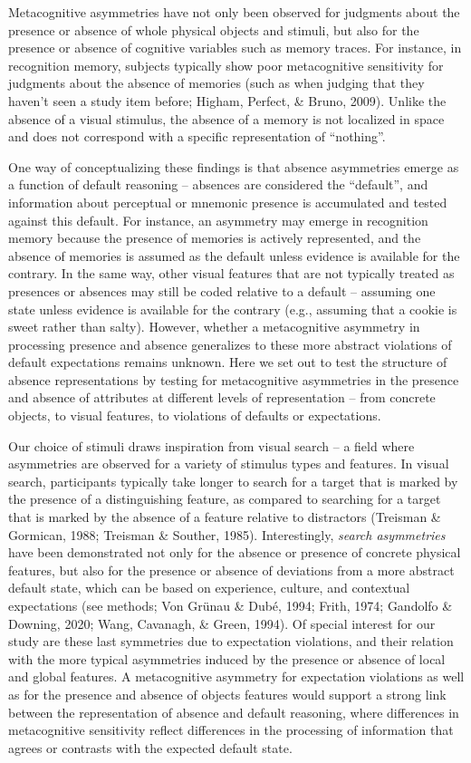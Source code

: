\documentclass[
  english,
  man,floatsintext]{apa6}
\begin{document}
Metacognitive asymmetries have not only been observed for judgments about the presence or absence of whole physical objects and stimuli, but also for the presence or absence of cognitive variables such as memory traces. For instance, in recognition memory, subjects typically show poor metacognitive sensitivity for judgments about the absence of memories (such as when judging that they haven't seen a study item before; Higham, Perfect, \& Bruno, 2009). Unlike the absence of a visual stimulus, the absence of a memory is not localized in space and does not correspond with a specific representation of \enquote{nothing}.

One way of conceptualizing these findings is that absence asymmetries emerge as a function of default reasoning -- absences are considered the \enquote{default}, and information about perceptual or mnemonic presence is accumulated and tested against this default. For instance, an asymmetry may emerge in recognition memory because the presence of memories is actively represented, and the absence of memories is assumed as the default unless evidence is available for the contrary. In the same way, other visual features that are not typically treated as presences or absences may still be coded relative to a default -- assuming one state unless evidence is available for the contrary (e.g., assuming that a cookie is sweet rather than salty). However, whether a metacognitive asymmetry in processing presence and absence generalizes to these more abstract violations of default expectations remains unknown. Here we set out to test the structure of absence representations by testing for metacognitive asymmetries in the presence and absence of attributes at different levels of representation -- from concrete objects, to visual features, to violations of defaults or expectations.

Our choice of stimuli draws inspiration from visual search -- a field where asymmetries are observed for a variety of stimulus types and features. In visual search, participants typically take longer to search for a target that is marked by the presence of a distinguishing feature, as compared to searching for a target that is marked by the absence of a feature relative to distractors (Treisman \& Gormican, 1988; Treisman \& Souther, 1985). Interestingly, \emph{search asymmetries} have been demonstrated not only for the absence or presence of concrete physical features, but also for the presence or absence of deviations from a more abstract default state, which can be based on experience, culture, and contextual expectations (see methods; Von Grünau \& Dubé, 1994; Frith, 1974; Gandolfo \& Downing, 2020; Wang, Cavanagh, \& Green, 1994). Of special interest for our study are these last symmetries due to expectation violations, and their relation with the more typical asymmetries induced by the presence or absence of local and global features. A metacognitive asymmetry for expectation violations as well as for the presence and absence of objects features would support a strong link between the representation of absence and default reasoning, where differences in metacognitive sensitivity reflect differences in the processing of information that agrees or contrasts with the expected default state.
\end{document}
